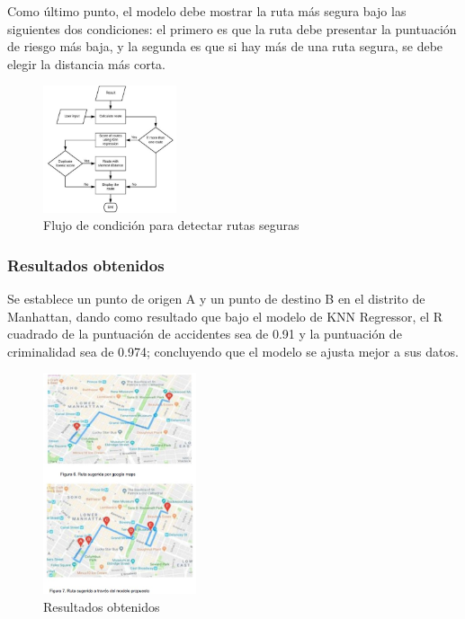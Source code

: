 Como último punto, el modelo debe mostrar la ruta más segura bajo las siguientes dos condiciones: el primero es que la ruta debe presentar la puntuación de riesgo más baja, y la segunda es que si hay más de una ruta segura, se debe elegir la distancia más corta.
\begin{figure}[h]
	\begin{center}
		\includegraphics[width=0.35\textwidth]{2/figures/CondicionSafe.jpg}
		\caption{Flujo de condición para detectar rutas seguras}
		\label{1:fig2}
	\end{center}
\end{figure}

\subsubsection{Resultados obtenidos}
Se establece un punto de origen A y un punto de destino B en el distrito de Manhattan, dando como resultado que bajo el modelo de KNN Regressor, el R cuadrado de la puntuación de accidentes sea de 0.91 y la puntuación de criminalidad sea de 0.974; concluyendo que el modelo se ajusta mejor a sus datos.

\begin{figure}[h]
	\begin{center}
		\includegraphics[width=0.4\textwidth]{2/figures/resultRoute.jpg}
		\caption{Resultados obtenidos}
		\label{1:fig2}
	\end{center}
\end{figure}

